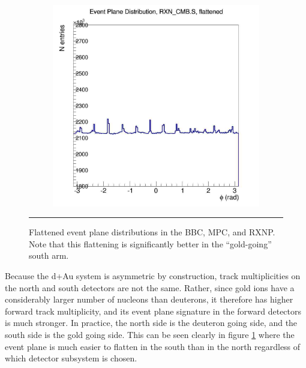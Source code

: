 \begin{figure}[htbp!]
\begin{subfigure}[p]{0.4\textwidth}
    \end{subfigure}
    \begin{subfigure}[p]{0.4\textwidth}
    \includegraphics[width=1\textwidth]{EPflattening/flatrxncmbs.jpg}
    \end{subfigure}
    \rule{35em}{0.5pt}
  \caption[Flattened event plane distributions in the BBC, MPC, and RXNP]{Flattened event plane distributions in the BBC, MPC, and RXNP. Note that this flattening is significantly better in the ``gold-going'' south arm.}
  \label{fig:evtpln}
\end{figure}

Because the d+Au system is asymmetric by construction, track multiplicities on the north and south detectors are not the same. Rather, since gold ions have a considerably larger number of nucleons than deuterons, it therefore has higher forward track multiplicity, and its event plane signature in the forward detectors is much stronger. In practice, the north side is the deuteron going side, and the south side is the gold going side. This can be seen clearly in figure \ref{fig:evtpln} where the event plane is much easier to flatten in the south than in the north regardless of which detector subsystem is chosen.

